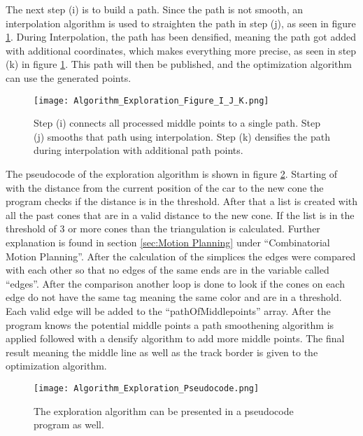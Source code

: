 The next step (i) is to build a path. Since the path is not smooth, an interpolation algorithm is used to straighten the path in step (j), as seen in figure \ref{fig:Algorithm Exploration Figure I, J and K}. During Interpolation, the path has been densified, meaning the path got added with additional coordinates, which makes everything more precise, as seen in step (k) in figure \ref{fig:Algorithm Exploration Figure I, J and K}. This path will then be published, and the optimization algorithm can use the generated points.
\begin{figure}[H]
    \centering
    \texttt{[image: Algorithm\_Exploration\_Figure\_I\_J\_K.png]}
    \caption{Step (i) connects all processed middle points to a single path. Step (j) smooths that path using interpolation. Step (k) densifies the path during interpolation with additional path points.}
    \label{fig:Algorithm Exploration Figure I, J and K}
\end{figure}

The pseudocode of the exploration algorithm is shown in figure \ref{fig:Algorithm Exploration Pseudocode}. Starting of with the distance from the current position of the car to the new cone the program checks if the distance is in the threshold. After that a list is created with all the past cones that are in a valid distance to the new cone. If the list is in the threshold of 3 or more cones than the triangulation is calculated. Further explanation is found in section \ref{sec:Motion Planning} under ``Combinatorial Motion Planning''. After the calculation of the simplices the edges were compared with each other so that no edges of the same ends are in the variable called ``edges''. After the comparison another loop is done to look if the cones on each edge do not have the same tag meaning the same color and are in a threshold. Each valid edge will be added to the ``pathOfMiddlepoints'' array. After the program knows the potential middle points a path smoothening algorithm is applied followed with a densify algorithm to add more middle points. The final result meaning the middle line as well as the track border is given to the optimization algorithm.

\begin{figure}[H]
    \centering
    \texttt{[image: Algorithm\_Exploration\_Pseudocode.png]}
    \caption{The exploration algorithm can be presented in a pseudocode program as well.}
    \label{fig:Algorithm Exploration Pseudocode}
\end{figure}

